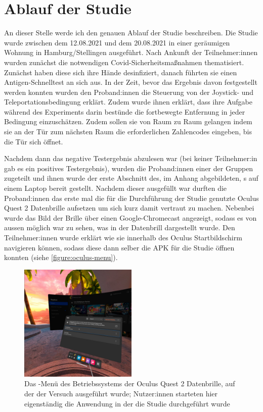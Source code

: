     \section{Ablauf der Studie}
        An dieser Stelle werde ich den genauen Ablauf der Studie beschreiben.
        Die Studie wurde zwischen dem 12.08.2021 und dem 20.08.2021 in einer geräumigen Wohnung in Hamburg/Stellingen ausgeführt. Nach Ankunft der Teilnehmer:innen wurden zunächst die notwendigen Covid-Sicherheitsmaßnahmen thematisiert.
        Zunächst haben diese sich ihre Hände desinfiziert, danach führten sie einen Antigen-Schnelltest an sich aus. In der Zeit, bevor das Ergebnis davon festgestellt werden konnten wurden den Proband:innen die Steuerung von der Joystick- und Teleportationsbedingung erklärt.
        Zudem wurde ihnen erklärt, dass ihre Aufgabe während des Experiments darin bestünde die fortbewegte Entfernung in jeder Bedingung einzuschätzen. Zudem sollen sie von Raum zu Raum gelangen indem sie an der Tür zum nächsten Raum die erforderlichen Zahlencodes eingeben, bis die Tür sich öffnet.

        Nachdem dann das negative Testergebnis abzulesen war (bei keiner Teilnehmer:in gab es ein positives Testergebnis), wurden die Proband:innen einer der Gruppen zugeteilt und ihnen wurde der erste Abschnitt des, im Anhang
        abgebildeten, s auf einem Laptop bereit gestellt. Nachdem dieser ausgefüllt war durften die Proband:innen das erste mal die für die Durchführung der Studie genutzte Oculus Quest 2 Datenbrille aufsetzen um sich kurz damit vertraut zu machen. Nebenbei wurde das Bild der Brille über einen Google-Chromecast angezeigt, sodass es von aussen möglich war zu sehen, was in der Datenbrill dargestellt wurde. Den Teilnehmer:innen wurde erklärt wie sie innerhalb des Oculus Startbildschirm navigieren können, sodass diese dann selber die APK für die Studie öffnen konnten (siehe \autoref{figure:oculus-menu}).

        \begin{figure}[!h]
            \centering
            \includegraphics[width=0.5\textwidth]{vrscreenshots/oculusmenu.jpg}
            \caption{Das -Menü des Betriebssystems der Oculus Quest 2 Datenbrille, auf der der Versuch ausgeführt wurde; Nutzer:innen starteten hier eigenständig die Anwendung in der die Studie durchgeführt wurde}\label{figure:oculus-menu}
        \end{figure}

